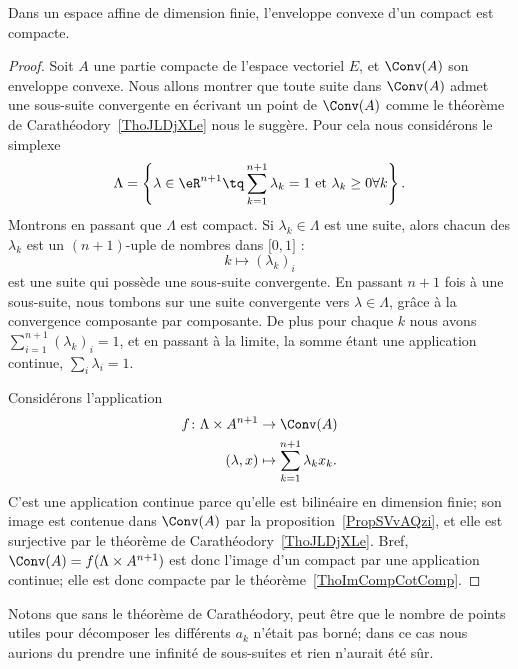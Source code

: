 \begin{corollary}   \label{CorOFrXzIf}
    Dans un espace affine de dimension finie, l'enveloppe convexe d'un compact est compacte.
\end{corollary}

\begin{proof}
    Soit \( A\) une partie compacte de l'espace vectoriel \( E\), et \( \Conv(A)\) son enveloppe convexe. Nous allons montrer que toute suite dans \( \Conv(A)\) admet une sous-suite convergente en écrivant un point de \( \Conv(A)\) comme le théorème de Carathéodory~\ref{ThoJLDjXLe} nous le suggère. Pour cela nous considérons le simplexe
    \begin{equation}
        \Lambda=\left\{  \lambda\in \eR^{n+1}\tq \sum_{k=1}^{n+1}\lambda_k=1\text{ et } \lambda_k\geq 0\forall k   \right\}.
    \end{equation}
    Montrons en passant que \( \Lambda\) est compact. Si \( \lambda_k\in \Lambda\) est une suite, alors chacun des \( \lambda_k\) est un \( (n+1)\)-uple de nombres dans \( \mathopen[ 0 , 1 \mathclose]\) :
    \begin{equation}
        k\mapsto (\lambda_k)_i
    \end{equation}
    est une suite qui possède une sous-suite convergente. En passant \( n+1\) fois à une sous-suite, nous tombons sur une suite convergente vers \( \lambda\in\Lambda\), grâce à la convergence composante par composante. De plus pour chaque \( k\) nous avons \( \sum_{i=1}^{n+1}(\lambda_k)_i=1\), et en passant à la limite, la somme étant une application continue, \( \sum_{i}\lambda_i=1\).

    Considérons l'application
    \begin{equation}
        \begin{aligned}
            f\colon \Lambda\times A^{n+1}&\to \Conv(A) \\
            (\lambda,x)&\mapsto \sum_{k=1}^{n+1}\lambda_kx_k.
        \end{aligned}
    \end{equation}
    C'est une application continue parce qu'elle est bilinéaire en dimension finie; son image est contenue dans \( \Conv(A)\) par la proposition~\ref{PropSVvAQzi}, et elle est surjective par le théorème de Carathéodory~\ref{ThoJLDjXLe}. Bref, \( \Conv(A)=f(\Lambda\times A^{n+1})\) est donc l'image d'un compact par une application continue; elle est donc compacte par le théorème~\ref{ThoImCompCotComp}.
\end{proof}
Notons que sans le théorème de Carathéodory, peut être que le nombre de points utiles pour décomposer les différents \( a_k\) n'était pas borné; dans ce cas nous aurions du prendre une infinité de sous-suites et rien n'aurait été sûr.


